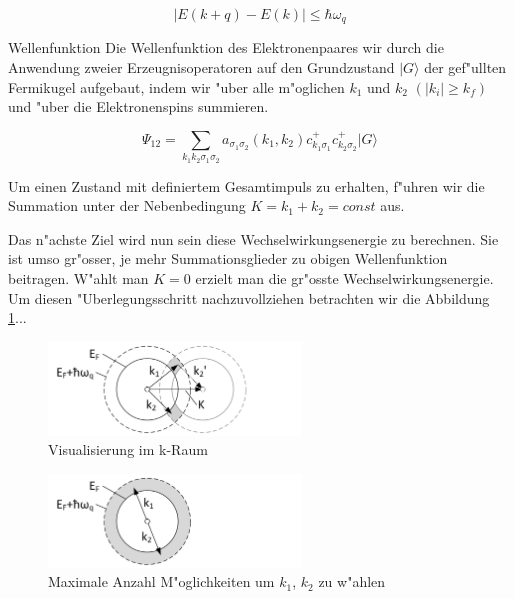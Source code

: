 \begin{refsection}
\begin{equation}
|E(k+q)-E(k)|\le\hbar\omega_q
\label{supraleitung:Phonon Energie}
\end{equation}

Wellenfunktion
Die Wellenfunktion des Elektronenpaares wir durch die Anwendung zweier Erzeugnisoperatoren auf den Grundzustand $|G\rangle$ der gef"ullten Fermikugel aufgebaut, indem wir "uber alle m"oglichen $k_1$ und $k_2$ $(|k_i| \ge k_f)$ und "uber die Elektronenspins summieren.

\begin{equation}
\Psi_{12}=\sum \limits_{k_1k_2\sigma_1\sigma_2} a_{\sigma_1\sigma_2}(k_1,k_2)c^+_{k_1\sigma_1}c^+_{k_2\sigma_2}|G\rangle
\label{supraleitung:Wellenfunktion ganz Allgemein}
\end{equation}

Um einen Zustand mit definiertem Gesamtimpuls zu erhalten, f"uhren wir die Summation unter der Nebenbedingung $K=k_1+k_2=const$ aus.

Das n"achste Ziel wird nun sein diese Wechselwirkungsenergie zu berechnen. Sie ist umso gr"osser, je mehr Summationsglieder zu obigen Wellenfunktion beitragen. W"ahlt man $K=0$ erzielt man die gr"osste Wechselwirkungsenergie. Um diesen "Uberlegungsschritt nachzuvollziehen betrachten wir die Abbildung \ref{supraleitung:kRaum_1}...
\\
\begin{figure}	
\centering
\includegraphics[width=0.6\textwidth]{supraleitung/kGraphic_05.png} %
\caption{Visualisierung im k-Raum
\label{supraleitung:kRaum_1}}
\end{figure}
\begin{figure}	
\centering
\includegraphics[width=0.6\textwidth]{supraleitung/kGraphic_09.png} %
\caption{Maximale Anzahl M"oglichkeiten um $k_1$, $k_2$ zu w"ahlen
\label{supraleitung:kRaum_2}}
\end{figure}


\end{refsection}
